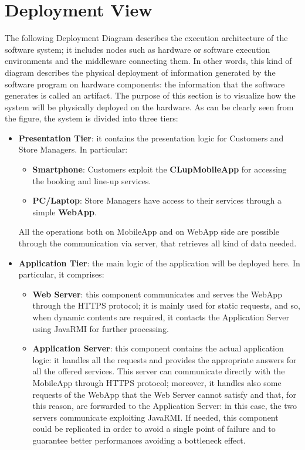 \section{Deployment View}

The following Deployment Diagram describes the execution architecture of the software system; it includes nodes such as hardware or software execution environments and the middleware connecting them. In other words, this kind of diagram describes the physical deployment of information generated by the software program on hardware components: the information that the software generates is called an artifact. The purpose of this section is to visualize how the system will be physically deployed on the hardware. As can be clearly seen from the figure, the system is divided into three tiers:
\begin{itemize}
	\item\textbf{Presentation Tier}: it contains the presentation logic for Customers and Store Managers. In particular:
		\begin{itemize}
			\item\textbf{Smartphone}: Customers exploit the \textbf{CLupMobileApp} for accessing the booking and line-up services.
			\item\textbf{PC/Laptop}:  Store Managers have access to their services through a simple \textbf{WebApp}.
		\end{itemize}
	All the operations both on MobileApp and on WebApp side are possible through the communication via server, that retrieves all kind of data needed.
	\item\textbf{Application Tier}: the main logic of the application will be deployed here. In particular, it comprises:
		\begin{itemize}
			\item\textbf{Web Server}: this component communicates and serves the WebApp through the HTTPS protocol; it is mainly used for static requests, and so, when dynamic contents are required, it contacts the Application Server using JavaRMI for further processing.  
			\item\textbf{Application Server}: this component contains the actual application logic: it handles all the requests and provides the appropriate answers for all the offered services. This server can communicate directly with the MobileApp through HTTPS protocol; moreover, it handles also some requests of the WebApp that the Web Server cannot satisfy and that, for this reason, are forwarded to the Application Server: in this case, the two servers communicate exploiting JavaRMI. If needed, this component could be replicated in order to avoid a single point of failure and to guarantee better performances avoiding a bottleneck effect. %

\end{itemize}
\end{itemize}
